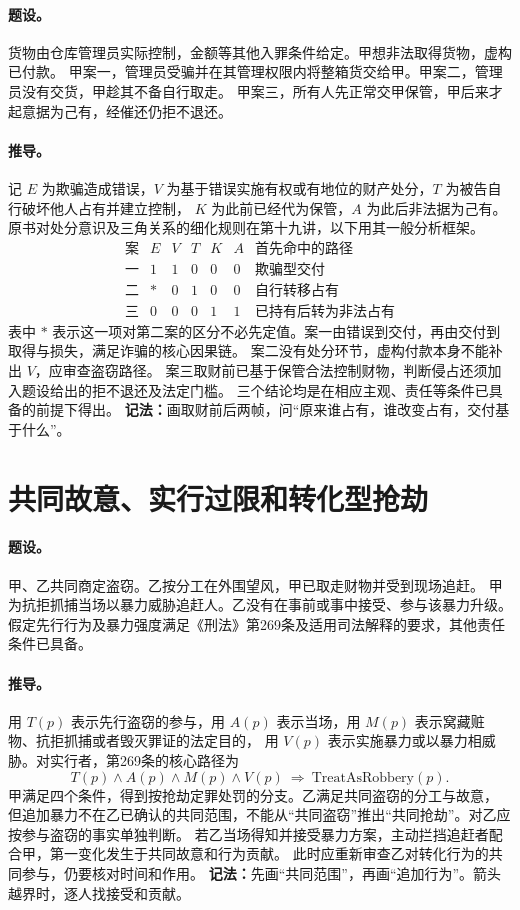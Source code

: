 \paragraph{题设。}
货物由仓库管理员实际控制，金额等其他入罪条件给定。甲想非法取得货物，虚构已付款。
甲案一，管理员受骗并在其管理权限内将整箱货交给甲。甲案二，管理员没有交货，甲趁其不备自行取走。
甲案三，所有人先正常交甲保管，甲后来才起意据为己有，经催还仍拒不退还。

\paragraph{推导。}
记 $E$ 为欺骗造成错误，$V$ 为基于错误实施有权或有地位的财产处分，$T$ 为被告自行破坏他人占有并建立控制，
$K$ 为此前已经代为保管，$A$ 为此后非法据为己有。
原书对处分意识及三角关系的细化规则在第十九讲，以下用其一般分析框架。
\[
\begin{array}{c|ccccc|l}
 \text{案}&E&V&T&K&A&\text{首先命中的路径}\\\hline
 \text{一}&1&1&0&0&0&\text{欺骗型交付}\\
 \text{二}&*&0&1&0&0&\text{自行转移占有}\\
 \text{三}&0&0&0&1&1&\text{已持有后转为非法占有}
\end{array}
\]
表中 $*$ 表示这一项对第二案的区分不必先定值。案一由错误到交付，再由交付到取得与损失，满足诈骗的核心因果链。
案二没有处分环节，虚构付款本身不能补出 $V$，应审查盗窃路径。
案三取财前已基于保管合法控制财物，判断侵占还须加入题设给出的拒不退还及法定门槛。
三个结论均是在相应主观、责任等条件已具备的前提下得出。
\textbf{记法：}画取财前后两帧，问“原来谁占有，谁改变占有，交付基于什么”。

\section{共同故意、实行过限和转化型抢劫}

\paragraph{题设。}
甲、乙共同商定盗窃。乙按分工在外围望风，甲已取走财物并受到现场追赶。
甲为抗拒抓捕当场以暴力威胁追赶人。乙没有在事前或事中接受、参与该暴力升级。
假定先行行为及暴力强度满足《刑法》第269条及适用司法解释的要求，其他责任条件已具备。

\paragraph{推导。}
用 $T(p)$ 表示先行盗窃的参与，用 $A(p)$ 表示当场，用 $M(p)$ 表示窝藏赃物、抗拒抓捕或者毁灭罪证的法定目的，
用 $V(p)$ 表示实施暴力或以暴力相威胁。对实行者，第269条的核心路径为
\[
 T(p)\land A(p)\land M(p)\land V(p)
 \ \Rightarrow\ \mathrm{TreatAsRobbery}(p).
\]
甲满足四个条件，得到按抢劫定罪处罚的分支。乙满足共同盗窃的分工与故意，
但追加暴力不在乙已确认的共同范围，不能从“共同盗窃”推出“共同抢劫”。对乙应按参与盗窃的事实单独判断。
若乙当场得知并接受暴力方案，主动拦挡追赶者配合甲，第一变化发生于共同故意和行为贡献。
此时应重新审查乙对转化行为的共同参与，仍要核对时间和作用。
\textbf{记法：}先画“共同范围”，再画“追加行为”。箭头越界时，逐人找接受和贡献。

